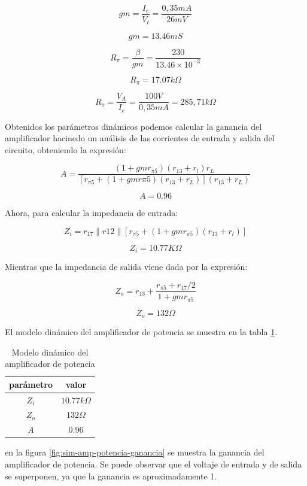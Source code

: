 $$gm = \frac{I_c}{V_t} = \frac{0,35 mA}{26 mV}$$

$$gm = 13.46 mS$$

$$R_\pi = \frac{\beta}{gm} = \frac{230}{13.46\times 10^{-3}}$$

$$ R_\pi = 17.07k \Omega$$

$$ R_o = \frac{V_A}{I_c} = \frac{100 V}{0,35 mA} = 285,71 k\Omega$$

Obtenidos los parámetros dinámicos podemos calcular la ganancia del amplificador hacinedo un análisis de las corrientes de entrada y salida del circuito, obteniendo la expresión:

 $$ A = \frac{(1 + gmr_{\pi5})(r_{13} + r_l)r_L}{[r_{\pi 5} + (1 + gmr\pi5)(r_{13} + r_L)](r_{13} + r_L)}$$

 $$A = 0.96 $$

 Ahora, para calcular la impedancia de entrada:

 $$ Z_i = r_{17} \parallel r{12} \parallel [r_{\pi5} + (1 + gmr_{\pi 5})(r_{13} + r_l)] $$
 
 $$ Z_i = 10.77K\Omega $$

 Mientras que la impedancia de salida viene dada por la expresión:

$$ Z_o = r_{13} + \frac{r_{\pi5} + r_{17}/2}{1 + gmr_{\pi5}} $$

 $$ Z_o = 132 \Omega$$

 El modelo dinámico del amplificador de potencia se muestra en la tabla \ref{tab:met-amp-potencia-modelo-dinamico}.

\begin{table}[ht]
    \centering
    \begin{tabular}{|c|c|}
        \hline
        parámetro & valor  \\
        \hline
        $Z_i$ & $10.77k\Omega$ \\
        \hline
        $Z_o$ & $132\Omega$ \\
        \hline
        $A$ & $0.96$ \\
        \hline
    \end{tabular}
    \caption{Modelo dinámico del amplificador de potencia}
    \label{tab:met-amp-potencia-modelo-dinamico}
\end{table}

en la figura \ref{fig:sim-amp-potencia-ganancia} se muestra la ganancia del amplificador de potencia. Se puede observar que el voltaje de entrada y de salida se superponen, ya que la ganancia es aproximadamente 1.

